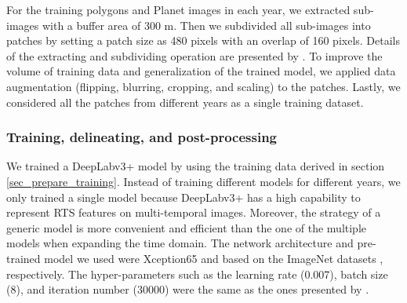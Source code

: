 \documentclass[authoryear,preprint,review,12pt]{elsarticle}
\begin{document}
For the training polygons and Planet images in each year, we extracted sub-images with a buffer area of 300 m. 
Then we subdivided all sub-images into patches by setting a patch size as 480 pixels with an overlap of 160 pixels. 
Details of the extracting and subdividing operation are presented by \cite{huang2018automatic}.
To improve the volume of training data and generalization of the trained model, we applied data augmentation (flipping, blurring, cropping, and scaling) to the patches. 
Lastly, we considered all the patches from different years as a single training dataset. 



\subsubsection{Training, delineating, and post-processing}
\label{sec_train_deli_post_pro}

We trained a DeepLabv3+ model by using the training data derived in section \ref{sec_prepare_training}. 
Instead of training different models for different years, we only trained a single model because DeepLabv3+ has a high capability to represent RTS features on multi-temporal images. 
Moreover, the strategy of a generic model is more convenient and efficient than the one of the multiple models when expanding the time domain. %
The network architecture and pre-trained model we used were Xception65 \citep{chollet2017xception} and based on the ImageNet datasets \citep{russakovsky2015imagenet}, respectively. 
The hyper-parameters such as the learning rate (0.007), batch size (8), and iteration number (30000) were the same as the ones presented by \cite{huang2020using}.

\end{document}

